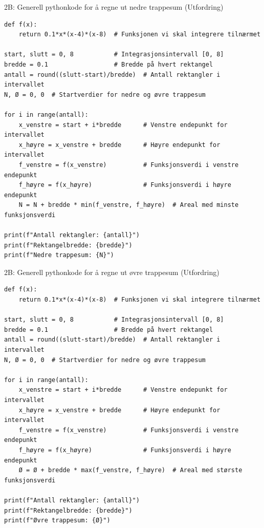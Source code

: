 \greenheader
\begin{frame}[fragile]{2B: Generell pythonkode for å regne ut nedre trappesum  (Utfordring)}
\begin{verbatim} 
def f(x):
    return 0.1*x*(x-4)*(x-8)  # Funksjonen vi skal integrere tilnærmet

start, slutt = 0, 8           # Integrasjonsintervall [0, 8]
bredde = 0.1                  # Bredde på hvert rektangel
antall = round((slutt-start)/bredde)  # Antall rektangler i intervallet
N, Ø = 0, 0  # Startverdier for nedre og øvre trappesum

for i in range(antall):
    x_venstre = start + i*bredde      # Venstre endepunkt for intervallet
    x_høyre = x_venstre + bredde      # Høyre endepunkt for intervallet
    f_venstre = f(x_venstre)          # Funksjonsverdi i venstre endepunkt
    f_høyre = f(x_høyre)              # Funksjonsverdi i høyre endepunkt
    N = N + bredde * min(f_venstre, f_høyre)  # Areal med minste funksjonsverdi
    
print(f"Antall rektangler: {antall}") 
print(f"Rektangelbredde: {bredde}")
print(f"Nedre trappesum: {N}")
\end{verbatim}
\end{frame}


\greenheader
\begin{frame}[fragile]{2B: Generell pythonkode for å regne ut øvre trappesum  (Utfordring) }
\begin{verbatim}
def f(x):
    return 0.1*x*(x-4)*(x-8)  # Funksjonen vi skal integrere tilnærmet

start, slutt = 0, 8           # Integrasjonsintervall [0, 8]
bredde = 0.1                  # Bredde på hvert rektangel
antall = round((slutt-start)/bredde)  # Antall rektangler i intervallet
N, Ø = 0, 0  # Startverdier for nedre og øvre trappesum

for i in range(antall):
    x_venstre = start + i*bredde      # Venstre endepunkt for intervallet
    x_høyre = x_venstre + bredde      # Høyre endepunkt for intervallet
    f_venstre = f(x_venstre)          # Funksjonsverdi i venstre endepunkt
    f_høyre = f(x_høyre)              # Funksjonsverdi i høyre endepunkt
    Ø = Ø + bredde * max(f_venstre, f_høyre)  # Areal med største funksjonsverdi

print(f"Antall rektangler: {antall}") 
print(f"Rektangelbredde: {bredde}")
print(f"Øvre trappesum: {Ø}")
\end{verbatim}
\end{frame}